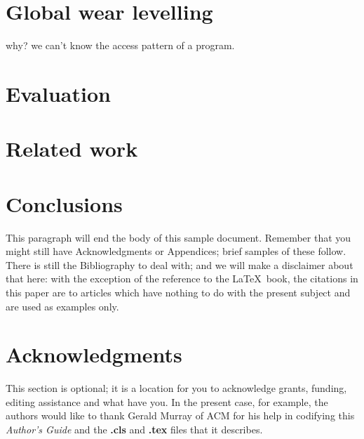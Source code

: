 \documentclass{vldb}
\begin{document}
\section{Global wear levelling}

why? we can’t know the access pattern of a program.

\section{Evaluation}

\section{Related work}


\section{Conclusions}
This paragraph will end the body of this sample document.
Remember that you might still have Acknowledgments or
Appendices; brief samples of these
follow.  There is still the Bibliography to deal with; and
we will make a disclaimer about that here: with the exception
of the reference to the \LaTeX\ book, the citations in
this paper are to articles which have nothing to
do with the present subject and are used as
examples only.

\balance

\section{Acknowledgments}
This section is optional; it is a location for you
to acknowledge grants, funding, editing assistance and
what have you.  In the present case, for example, the
authors would like to thank Gerald Murray of ACM for
his help in codifying this \textit{Author's Guide}
and the \textbf{.cls} and \textbf{.tex} files that it describes.



\end{document}
